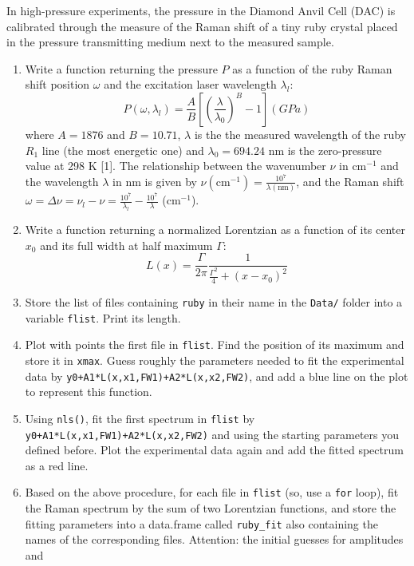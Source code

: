 \documentclass[]{article}
\begin{document}
In high-pressure experiments, the pressure in the Diamond Anvil Cell
(DAC) is calibrated through the measure of the Raman shift of a tiny
ruby crystal placed in the pressure transmitting medium next to the
measured sample.

\begin{enumerate}
\def\labelenumi{\arabic{enumi}.}
\item
  Write a function returning the pressure \(P\) as a function of the
  ruby Raman shift position \(\omega\) and the excitation laser
  wavelength \(\lambda_l\):
  \[P(\omega, \lambda_l) = \frac{A}{B}\left[\left(\frac{\lambda}{\lambda_0}\right)^B-1\right] (GPa)\]
  where \(A=1876\) and \(B=10.71\), \(\lambda\) is the the measured
  wavelength of the ruby \(R_1\) line (the most energetic one) and
  \(\lambda_0=694.24\) nm is the zero-pressure value at 298 K {[}1{]}.
  The relationship between the wavenumber \(\nu\) in cm\(^{-1}\) and the
  wavelength \(\lambda\) in nm is given by
  \(\nu(\text{cm}^{-1})=\frac{10^7}{\lambda(\text{nm})}\), and the Raman
  shift
  \(\omega=\Delta\nu=\nu_l-\nu=\frac{10^7}{\lambda_l}-\frac{10^7}{\lambda}\)
  (cm\(^{-1}\)).
\item
  Write a function returning a normalized Lorentzian as a function of
  its center \(x_0\) and its full width at half maximum \(\Gamma\):
  \[L(x)=\frac{\Gamma}{2\pi}\frac{1}{\frac{\Gamma^2}{4}+\left(x-x_0\right)^2}\]
\item
  Store the list of files containing \texttt{ruby} in their name in the
  \texttt{Data/} folder into a variable \texttt{flist}. Print its
  length.
\item
  Plot with points the first file in \texttt{flist}. Find the position
  of its maximum and store it in \texttt{xmax}. Guess roughly the
  parameters needed to fit the experimental data by
  \texttt{y0+A1*L(x,x1,FW1)+A2*L(x,x2,FW2)}, and add a blue line on the
  plot to represent this function.
\item
  Using \texttt{nls()}, fit the first spectrum in \texttt{flist} by
  \texttt{y0+A1*L(x,x1,FW1)+A2*L(x,x2,FW2)} and using the starting
  parameters you defined before. Plot the experimental data again and
  add the fitted spectrum as a red line.
\item
  Based on the above procedure, for each file in \texttt{flist} (so, use
  a \texttt{for} loop), fit the Raman spectrum by the sum of two
  Lorentzian functions, and store the fitting parameters into a
  data.frame called \texttt{ruby\_fit} also containing the names of the
  corresponding files. Attention: the initial guesses for amplitudes and

\end{enumerate}
\end{document}
